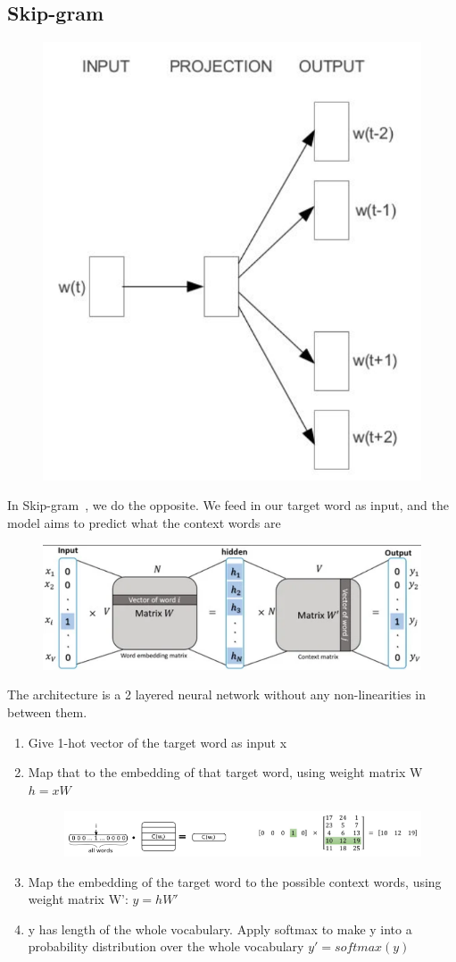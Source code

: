 \documentclass[11pt]{article}
\begin{document}
\subsection{Skip-gram}

\begin{figure}[H]
    \centering
    \includegraphics[width=.3\linewidth]{figures/SkipGram.png}
\end{figure}

In Skip-gram~\cite{WordSenseDisambiguation,CBOW-and-skipgram}, we do the opposite. We feed in our target word as input, and the model aims to predict what the context words are

\begin{figure}[H]
    \centering
    \includegraphics[trim={0 0 0 5px}, clip, width=\linewidth]{figures/SkipGramDetailed.png}
\end{figure}

The architecture is a 2 layered neural network without any non-linearities in between them. 

\begin{enumerate}
    \item Give 1-hot vector of the target word as input x
    \item Map that to the embedding of that target word, using weight matrix W $h=xW$
    
    \begin{figure}
        \centering
        \includegraphics*[width=\linewidth]{figures/one-hot-word-embedding-extraction.png}
    \end{figure}

    \item Map the embedding of the target word to the possible context words, using weight matrix W': $y=hW'$
    \item y has length of the whole vocabulary. Apply softmax to make y into a probability distribution over the whole vocabulary $y'=softmax(y)$
\end{enumerate}
\end{document}
